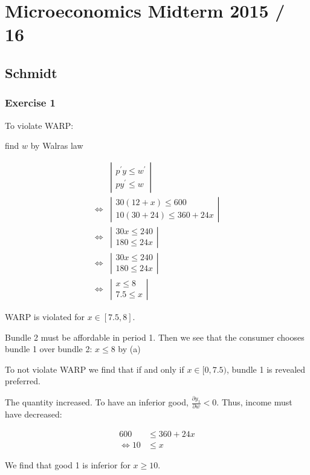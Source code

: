 \section*{Microeconomics Midterm 2015 / 16}

{
\subsection*{Schmidt}

\subsubsection*{Exercise 1}

\begin{enumerate}[label=(\alph*)]
{\item 
To violate WARP:

find $w$ by Walras law

$$
\begin{aligned}
& \left|\begin{array}{l}
p^{\prime} y \leqslant w^{\prime} \\
p y^{\prime} \leqslant w
\end{array}\right| \\
\Leftrightarrow&\left|\begin{array}{l}
30(12+x) \leqslant 600 \\
10(30+24) \leqslant 360+24 x
\end{array}\right| \\
\Leftrightarrow& \left|\begin{array}{l}
30 x \leqslant 240 \\
180 \leqslant 24 x
\end{array}\right| \\
\Leftrightarrow& \left|\begin{array}{l}
30 x \leqslant 240 \\
180 \leqslant 24 x
\end{array}\right| \\
\Leftrightarrow& \left|\begin{array}{c}
x \leqslant 8 \\
7.5 \leqslant x
\end{array}\right|
\end{aligned}
$$

WARP is violated for $x \in[7.5,8]$.
}
{\item
Bundle 2 must be affordable in period 1. Then we see that the consumer chooses bundle 1 over bundle 2: $x \leqslant 8$ by (a)

To not violate WARP we find that if and only if $x \in[0,7.5)$, bundle 1 is revealed preferred.
}
{\item 
The quantity increased. To have an inferior good, $\frac{\partial y_{1}}{\partial w}<0$. Thus, income must have decreased:

$$
\begin{aligned}
600 & \leqslant 360+24 x \\
\Leftrightarrow 10 & \leqslant x
\end{aligned}
$$

We find that good 1 is inferior for $x \geqslant 10$.
}
\end{enumerate}
}

